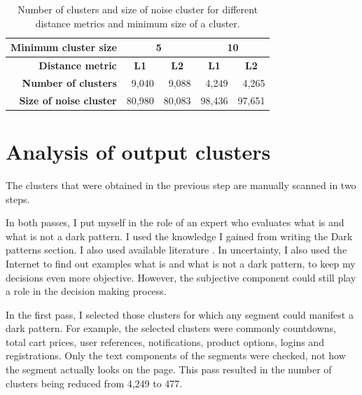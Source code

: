        \begin{table}[h!]
            \centering
            \bgroup
            \def\arraystretch{1.65}
            \begin{tabular}{r|cr|cr}
                \toprule
                \textbf{Minimum cluster size}  & \multicolumn{2}{c|}{\textbf{5}}                               & \multicolumn{2}{c}{\textbf{10}}                              \\ \hline
                \textbf{Distance metric}       & \multicolumn{1}{c|}{\textbf{L1}}    & \multicolumn{1}{c|}{\textbf{L2}} & \multicolumn{1}{c|}{\textbf{L1}}    & \multicolumn{1}{c}{\textbf{L2}} \\ \hline
                \textbf{Number of clusters}    & \multicolumn{1}{r|}{9,040}  & 9,088                    & \multicolumn{1}{r|}{4,249}  & 4,265                    \\ \hline
                \textbf{Size of noise cluster} & \multicolumn{1}{r|}{80,980} & 80,083                   & \multicolumn{1}{r|}{98,436} & 97,651                   \\
            \end{tabular}
            \egroup
            \caption{Number of clusters and size of noise cluster for different distance metrics and minimum size of a cluster.}
            \label{table:hyperparameters-hdbscan}
        \end{table}

    \section{Analysis of output clusters}
    \label{section:analysis-of-output-clusters}
        The clusters that were obtained in the previous step are manually scanned in two steps.

        In both passes, I put myself in the role of an expert who evaluates what is and what is not a dark pattern. I used the knowledge I gained from writing the Dark patterns section. I also used available literature \cite{dark-patterns-brignull-types}\cite{dark-patterns-colin}\cite{kysar-douglas}\cite{taxonomies-tales}\cite{taxonomies-conti}. In uncertainty, I also used the Internet to find out examples what is and what is not a dark pattern, to keep my decisions even more objective. However, the subjective component could still play a role in the decision making process.

        In the first pass, I selected those clusters for which any segment could manifest a dark pattern. For example, the selected clusters were commonly countdowns, total cart prices, user references, notifications, product options, logins and registrations. Only the text components of the segments were checked, not how the segment actually looks on the page. This pass resulted in the number of clusters being reduced from 4,249 to 477.
        
